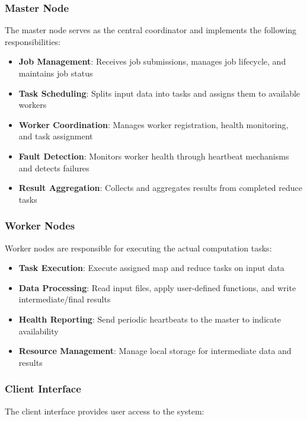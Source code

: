 \documentclass[11pt,letterpaper,oneside]{article}
\begin{document}
\subsubsection{Master Node}

The master node serves as the central coordinator and implements the following responsibilities:

\begin{itemize}
    \item \textbf{Job Management}: Receives job submissions, manages job lifecycle, and maintains job status
    \item \textbf{Task Scheduling}: Splits input data into tasks and assigns them to available workers
    \item \textbf{Worker Coordination}: Manages worker registration, health monitoring, and task assignment
    \item \textbf{Fault Detection}: Monitors worker health through heartbeat mechanisms and detects failures
    \item \textbf{Result Aggregation}: Collects and aggregates results from completed reduce tasks
\end{itemize}

\subsubsection{Worker Nodes}

Worker nodes are responsible for executing the actual computation tasks:

\begin{itemize}
    \item \textbf{Task Execution}: Execute assigned map and reduce tasks on input data
    \item \textbf{Data Processing}: Read input files, apply user-defined functions, and write intermediate/final results
    \item \textbf{Health Reporting}: Send periodic heartbeats to the master to indicate availability
    \item \textbf{Resource Management}: Manage local storage for intermediate data and results
\end{itemize}

\subsubsection{Client Interface}

The client interface provides user access to the system:
\end{document}
